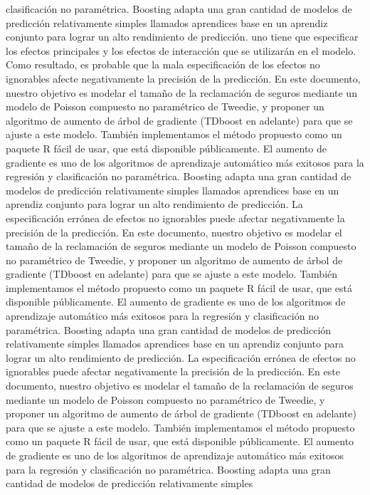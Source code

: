 \documentclass[]{article}
\begin{document}
clasificación no paramétrica. Boosting adapta una gran cantidad de
modelos de predicción relativamente simples llamados aprendices base en
un aprendiz conjunto para lograr un alto rendimiento de predicción. uno
tiene que especificar los efectos principales y los efectos de
interacción que se utilizarán en el modelo. Como resultado, es probable
que la mala especificación de los efectos no ignorables afecte
negativamente la precisión de la predicción. En este documento, nuestro
objetivo es modelar el tamaño de la reclamación de seguros mediante un
modelo de Poisson compuesto no paramétrico de Tweedie, y proponer un
algoritmo de aumento de árbol de gradiente (TDboost en adelante) para
que se ajuste a este modelo. También implementamos el método propuesto
como un paquete R fácil de usar, que está disponible públicamente. El
aumento de gradiente es uno de los algoritmos de aprendizaje automático
más exitosos para la regresión y clasificación no paramétrica. Boosting
adapta una gran cantidad de modelos de predicción relativamente simples
llamados aprendices base en un aprendiz conjunto para lograr un alto
rendimiento de predicción. La especificación errónea de efectos no
ignorables puede afectar negativamente la precisión de la predicción. En
este documento, nuestro objetivo es modelar el tamaño de la reclamación
de seguros mediante un modelo de Poisson compuesto no paramétrico de
Tweedie, y proponer un algoritmo de aumento de árbol de gradiente
(TDboost en adelante) para que se ajuste a este modelo. También
implementamos el método propuesto como un paquete R fácil de usar, que
está disponible públicamente. El aumento de gradiente es uno de los
algoritmos de aprendizaje automático más exitosos para la regresión y
clasificación no paramétrica. Boosting adapta una gran cantidad de
modelos de predicción relativamente simples llamados aprendices base en
un aprendiz conjunto para lograr un alto rendimiento de predicción. La
especificación errónea de efectos no ignorables puede afectar
negativamente la precisión de la predicción. En este documento, nuestro
objetivo es modelar el tamaño de la reclamación de seguros mediante un
modelo de Poisson compuesto no paramétrico de Tweedie, y proponer un
algoritmo de aumento de árbol de gradiente (TDboost en adelante) para
que se ajuste a este modelo. También implementamos el método propuesto
como un paquete R fácil de usar, que está disponible públicamente. El
aumento de gradiente es uno de los algoritmos de aprendizaje automático
más exitosos para la regresión y clasificación no paramétrica. Boosting
adapta una gran cantidad de modelos de predicción relativamente simples
\end{document}
